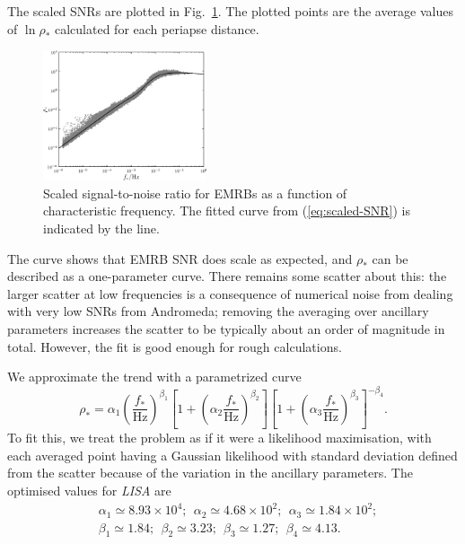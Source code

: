 \documentclass[useAMS,usedcolumn,usegraphicx,usenatbib]{mn2e}
\newcommand{\eqnref}[1]{(\ref{eq:#1})}
\newcommand{\figref}[1]{Fig.~\ref{fig:#1}}
\begin{document}
The scaled SNRs are plotted in \figref{scaled-SNR}. The plotted points are the average values of $\ln \rho_\ast$ calculated for each periapse distance.
\begin{figure}
\begin{center}
 \includegraphics[width=0.43\textwidth]{Fig_SNR_scaled_fit}
 \caption{Scaled signal-to-noise ratio for EMRBs as a function of characteristic frequency. The fitted curve from \eqnref{scaled-SNR} is indicated by the line.\label{fig:scaled-SNR}}
   \end{center}
\end{figure}
The curve shows that EMRB SNR does scale as expected, and $\rho_\ast$ can be described as a one-parameter curve. There remains some scatter about this: the larger scatter at low frequencies is a consequence of numerical noise from dealing with very low SNRs from Andromeda; removing the averaging over ancillary parameters increases the scatter to be typically about an order of magnitude in total. However, the fit is good enough for rough calculations.

We approximate the trend with a parametrized curve
\begin{equation}
\rho_\ast = \alpha_1 \left(\frac{f_\ast}{\mathrm{Hz}}\right)^{\beta_1} \left[1 + \left(\alpha_2 \frac{f_\ast}{\mathrm{Hz}}\right)^{\beta_2}\right]\left[1 + \left(\alpha_3 \frac{f_\ast}{\mathrm{Hz}}\right)^{\beta_3}\right]^{-\beta_4}.
\label{eq:scaled-SNR}
\end{equation}
To fit this, we treat the problem as if it were a likelihood maximisation, with each averaged point having a Gaussian likelihood with standard deviation defined from the scatter because of the variation in the ancillary parameters. The optimised values for \textit{LISA} are
\begin{equation}
\begin{split}
&\alpha_1 \simeq 8.93 \times 10^4; \ \ \alpha_2 \simeq 4.68 \times 10^2; \ \  \alpha_3 \simeq 1.84 \times 10^2;\\
&\beta_1 \simeq 1.84; \ \ \beta_2 \simeq 3.23; \ \ \beta_3 \simeq 1.27; \ \ \beta_4 \simeq 4.13.
\end{split}
\end{equation}
\end{document}
